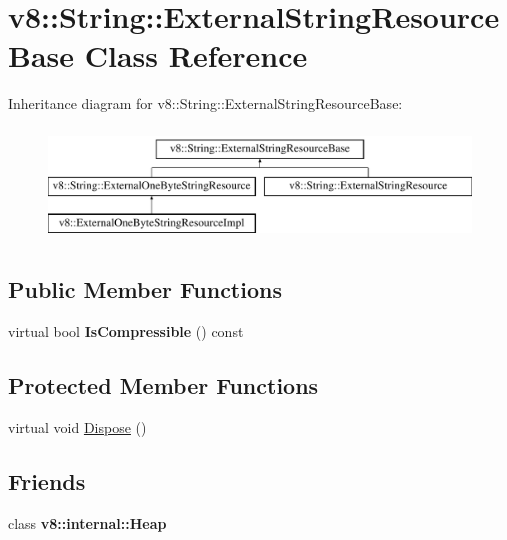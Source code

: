 \hypertarget{classv8_1_1String_1_1ExternalStringResourceBase}{}\section{v8\+:\+:String\+:\+:External\+String\+Resource\+Base Class Reference}
\label{classv8_1_1String_1_1ExternalStringResourceBase}
Inheritance diagram for v8\+:\+:String\+:\+:External\+String\+Resource\+Base\+:\begin{figure}[H]
\begin{center}
\leavevmode
\includegraphics[height=3.000000cm]{classv8_1_1String_1_1ExternalStringResourceBase}
\end{center}
\end{figure}
\subsection*{Public Member Functions}
\begin{DoxyCompactItemize}
\item 
virtual bool {\bfseries Is\+Compressible} () const \hypertarget{classv8_1_1String_1_1ExternalStringResourceBase_ace144d07dbe4e91665ee3ee22635e365}{}\label{classv8_1_1String_1_1ExternalStringResourceBase_ace144d07dbe4e91665ee3ee22635e365}

\end{DoxyCompactItemize}
\subsection*{Protected Member Functions}
\begin{DoxyCompactItemize}
\item 
virtual void \hyperlink{classv8_1_1String_1_1ExternalStringResourceBase_af4720342ae31e1ab4656df3f15d069c0}{Dispose} ()
\end{DoxyCompactItemize}
\subsection*{Friends}
\begin{DoxyCompactItemize}
\item 
class {\bfseries v8\+::internal\+::\+Heap}\hypertarget{classv8_1_1String_1_1ExternalStringResourceBase_a2d52f783e6ad51ce2c8f89eb1ebc7599}{}\label{classv8_1_1String_1_1ExternalStringResourceBase_a2d52f783e6ad51ce2c8f89eb1ebc7599}

\end{DoxyCompactItemize}


